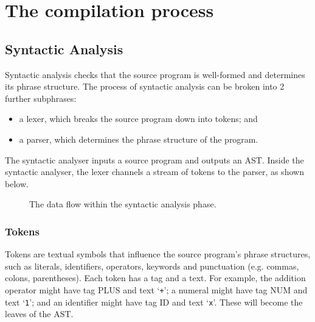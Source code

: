 \documentclass[a4paper, openany]{memoir}
\begin{document}
\chapter{The compilation process}
\section{Syntactic Analysis}
Syntactic analysis checks that the source program is well-formed and determines its phrase structure. The process of syntactic analysis can be broken into 2 further subphrases:
\begin{itemize}
    \item a lexer, which breaks the source program down into tokens; and
    \item a parser, which determines the phrase structure of the program.
\end{itemize}

The syntactic analyser inputs a source program and outputs an AST. Inside the syntactic analyser, the lexer channels a stream of tokens to the parser, as shown below.
\begin{figure}[H]
    \centering
    \caption{The data flow within the syntactic analysis phase.}
\end{figure}

\subsection{Tokens}
Tokens are textual symbols that influence the source program's phrase structures, such as literals, identifiers, operators, keywords and punctuation (e.g. commas, colons, parentheses). Each token has a tag and a text. For example, the addition operator might have tag PLUS and text `\texttt{+}'; a numeral might have tag NUM and text `\texttt{1}'; and an identifier might have tag ID and text `\texttt{x}'. These will become the leaves of the AST.
\end{document}

